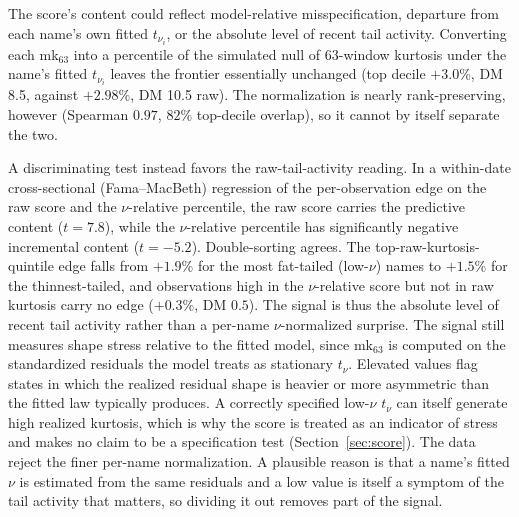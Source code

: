\documentclass[11pt]{article}
\theoremstyle{remark}
\begin{document}
The score's content could reflect model-relative
misspecification, departure from each name's own fitted $t_{\nu_i}$, or
the absolute level of recent tail activity. Converting each
mk$_{63}$ into a percentile of the simulated null of 63-window kurtosis
under the name's fitted $t_{\nu_i}$ leaves the frontier essentially
unchanged (top decile $+3.0\%$, DM 8.5, against $+2.98\%$, DM 10.5 raw).
The normalization is nearly rank-preserving, however (Spearman $0.97$, $82\%$
top-decile overlap), so it cannot by itself separate the two.

A discriminating test instead favors the raw-tail-activity reading.
In a within-date cross-sectional (Fama--MacBeth) regression of the
per-observation edge on the raw score and the $\nu$-relative percentile,
the raw score carries the predictive content ($t=7.8$), while the $\nu$-relative percentile has significantly negative incremental content ($t=-5.2$). Double-sorting agrees. The top-raw-kurtosis-quintile edge falls from $+1.9\%$ for the most fat-tailed (low-$\nu$) names to $+1.5\%$ for the thinnest-tailed, and observations high in the $\nu$-relative score but not in raw kurtosis carry no edge ($+0.3\%$, DM $0.5$). The signal is thus the absolute level of recent tail activity rather than
a per-name $\nu$-normalized surprise. The signal still measures shape
stress relative to the fitted model, since $\mathrm{mk}_{63}$ is computed on the
standardized residuals the model treats as stationary $t_\nu$.
Elevated values flag states in which the realized residual shape is
heavier or more asymmetric than the fitted law typically produces. A correctly specified low-$\nu$ $t_\nu$ can itself generate high realized kurtosis, which is why the score is treated as an indicator of stress and makes no claim to be a specification test (Section~\ref{sec:score}). The data reject the finer per-name normalization. A plausible reason is that a name's fitted $\nu$ is estimated from the same residuals and a low value is itself a symptom of the tail activity that matters, so dividing it out removes part of the signal.
\end{document}
